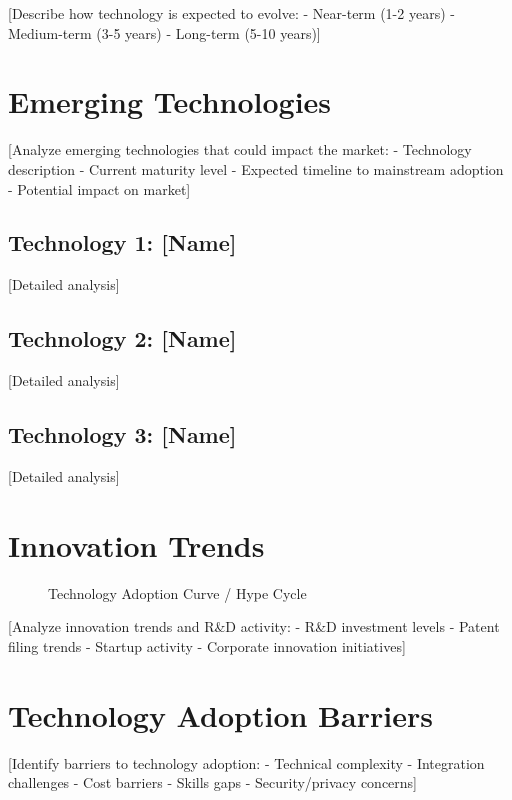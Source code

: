 \documentclass[11pt,letterpaper]{report}
\begin{document}
[Describe how technology is expected to evolve:
- Near-term (1-2 years)
- Medium-term (3-5 years)
- Long-term (5-10 years)]

\section{Emerging Technologies}

[Analyze emerging technologies that could impact the market:
- Technology description
- Current maturity level
- Expected timeline to mainstream adoption
- Potential impact on market]

\subsection{Technology 1: [Name]}
[Detailed analysis]

\subsection{Technology 2: [Name]}
[Detailed analysis]

\subsection{Technology 3: [Name]}
[Detailed analysis]

\section{Innovation Trends}


\begin{figure}[htbp]
\centering
\caption{Technology Adoption Curve / Hype Cycle}
\label{fig:innovation}
\end{figure}

[Analyze innovation trends and R\&D activity:
- R\&D investment levels
- Patent filing trends
- Startup activity
- Corporate innovation initiatives]

\section{Technology Adoption Barriers}

[Identify barriers to technology adoption:
- Technical complexity
- Integration challenges
- Cost barriers
- Skills gaps
- Security/privacy concerns]
\end{document}
